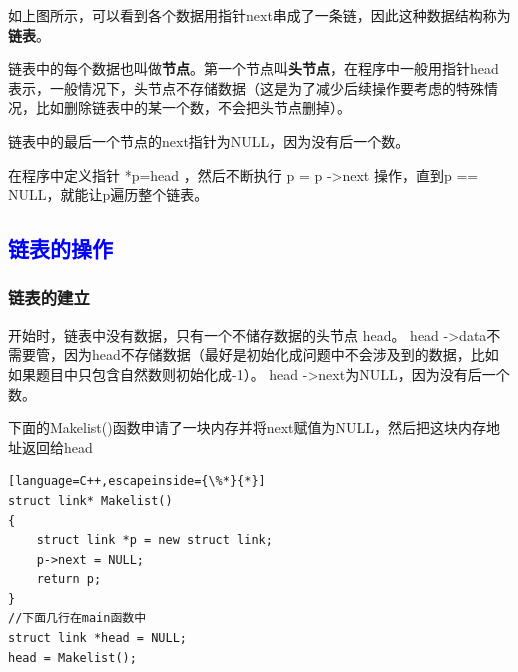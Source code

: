 \documentclass[UTF8]{ctexart}
\begin{document}
如上图所示，可以看到各个数据用指针next串成了一条链，因此这种数据结构称为\textbf{链表}。

链表中的每个数据也叫做\textbf{节点}。第一个节点叫\textbf{头节点}，在程序中一般用指针head表示，一般情况下，头节点不存储数据（这是为了减少后续操作要考虑的特殊情况，比如删除链表中的某一个数，不会把头节点删掉）。

链表中的最后一个节点的next指针为NULL，因为没有后一个数。

在程序中定义指针 *p=head ，然后不断执行 p = p -\textgreater next 操作，直到p == NULL，就能让p遍历整个链表。

\subsection{\textcolor{blue}{链表的操作}}
\subsubsection{链表的建立}
开始时，链表中没有数据，只有一个不储存数据的头节点 head。
head -\textgreater data不需要管，因为head不存储数据（最好是初始化成问题中不会涉及到的数据，比如如果题目中只包含自然数则初始化成-1）。
head -\textgreater next为NULL，因为没有后一个数。

下面的Makelist()函数申请了一块内存并将next赋值为NULL，然后把这块内存地址返回给head
\begin{lstlisting}[language=C++,escapeinside={\%*}{*}]
struct link* Makelist()
{
	struct link *p = new struct link;
	p->next = NULL;
	return p;
}
//下面几行在main函数中 
struct link *head = NULL;
head = Makelist();
\end{lstlisting}
\end{document}
